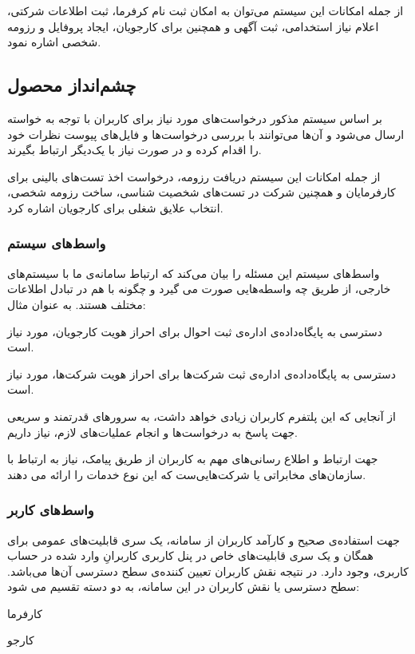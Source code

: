 \documentclass[12pt,svgnames,oneside]{book}
\newcounter{itemadded}
\let\LaTeXStandardEnumerateBegin\enumerate
\let\LaTeXStandardEnumerateEnd\endenumerate
\renewenvironment{enumerate}{%
	\LaTeXStandardEnumerateBegin%
	\setcounter{itemadded}{0}
}{%
	\LaTeXStandardEnumerateEnd%
}%
\begin{document}
			از جمله امکانات این سیستم می‌توان به امکان ثبت نام کرفرما، ثبت اطلاعات شرکتی، اعلام نیاز استخدامی، ثبت آگهی و همچنین برای کارجویان، ایجاد پروفایل و رزومه شخصی اشاره نمود.

			\subsection{چشم‌انداز محصول}
				بر اساس سیستم مذکور درخواست‌های مورد نیاز برای کاربران با توجه به خواسته ارسال می‌شود و آن‌ها می‌توانند با بررسی درخواست‌ها و فایل‌های پیوست نظرات خود را اقدام کرده و در صورت نیاز با یک‌دیگر ارتباط بگیرند.

				از جمله امکانات این سیستم دریافت رزومه، درخواست اخذ تست‌های بالینی برای کارفرمایان و همچنین شرکت در تست‌های شخصیت شناسی، ساخت رزومه شخصی، انتخاب علایق شغلی برای کارجویان اشاره کرد.

				\subsubsection{واسط‌های سیستم}
					واسط‌های سیستم این مسئله را بیان می‌کند که ارتباط سامانه‌ی ما با سیستم‌های خارجی، از طریق چه واسطه‌هایی صورت می گیرد و چگونه با هم در تبادل اطلاعات مختلف هستند. به عنوان مثال:
					\begin{enumerate}
						\item
	دسترسی به پایگاه‌داده‌ی اداره‌ی ثبت احوال برای احراز هویت کارجو‌یان، مورد نیاز است.
						\item
	دسترسی به پایگاه‌داده‌ی اداره‌ی ثبت شرکت‌ها برای احراز هویت شرکت‌ها، مورد نیاز است.
						\item
	از آنجایی که این پلتفرم کاربران زیادی خواهد داشت، به سرور‌های قدرتمند و سریعی جهت پاسخ به درخواست‌ها و انجام عملیات‌های لازم، نیاز داریم.
						\item
	جهت ارتباط و اطلاع رسانی‌های مهم به کاربران از طریق پیامک، نیاز به ارتباط با سازمان‌های مخابراتی یا شرکت‌هایی‌ست که این نوع خدمات را ارائه می دهند.
					\end{enumerate}
				\subsubsection{واسط‌های کاربر}
					جهت استفاده‌ی صحیح و کارآمد کاربران از سامانه، یک سری قابلیت‌های عمومی برای همگان و یک سری قابلیت‌های خاص در پنل کاربری کاربرانِ وارد شده در حساب کاربری، وجود دارد. در نتیجه نقش کاربران تعیین کننده‌ی سطح دسترسی آن‌ها می‌باشد.
					سطح‌ دسترسی یا نقش کاربران در این سامانه، به دو دسته تقسیم می شود:
					\begin{enumerate}
						\item کارفرما
						\item کارجو
					\end{enumerate}
\end{document}
